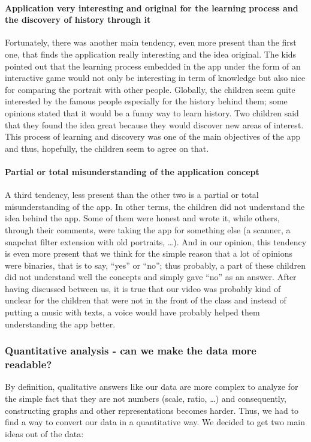 \documentclass[12pt]{scrartcl}
\begin{document}
				\paragraph{Application very interesting and original for the learning process and the discovery of history through it}
					Fortunately, there was another main tendency, even more present than the first one, that finds the application really interesting and the idea original. The kids pointed out that the learning process embedded in the app under the form of an interactive game would not only be interesting in term of knowledge but also nice for comparing the portrait with other people. Globally, the children seem quite interested by the famous people especially for the history behind them; some opinions stated that it would be a funny way to learn history. Two children said that they found the idea great because they would discover new areas of interest. This process of learning and discovery was one of the main objectives of the app and thus, hopefully, the children seem to agree on that. 

				\paragraph{Partial or total misunderstanding of the application concept}
					A third tendency, less present than the other two is a partial or total misunderstanding of the app. In other terms, the children did not understand the idea behind the app. Some of them were honest and wrote it, while others, through their comments, were taking the app for something else (a scanner, a snapchat filter extension with old portraits, …). And in our opinion, this tendency is even more present that we think for the simple reason that a lot of opinions were binaries, that is to say, “yes” or “no”; thus probably, a part of these children did not understand well the concepts and simply gave “no” as an answer. After having discussed between us, it is true that our video was probably kind of unclear for the children that were not in the front of the class and instead of putting a music with texts, a voice would have probably helped them understanding the app better.
					
					
		\subsubsection*{Quantitative analysis - can we make the data more readable?}

			By definition, qualitative answers like our data are more complex to analyze for the simple fact that they are not numbers (scale, ratio, …) and consequently, constructing graphs and other representations becomes harder. Thus, we had to find a way to convert our data in a quantitative way. We decided to get two main ideas out of the data:\\
			
\end{document}
